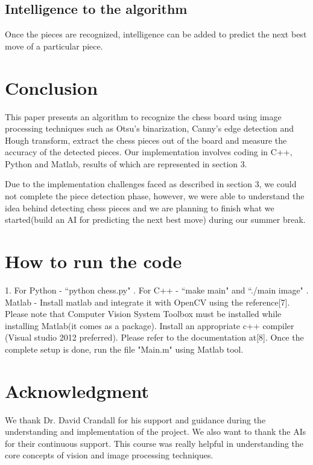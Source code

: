 \documentclass[conference]{IEEEtran}
\begin{document}
\subsection{Intelligence to the algorithm}
Once the pieces are recognized, intelligence can be added to predict the next best move of a particular piece. 

\section{Conclusion}
This paper presents an algorithm to recognize the chess board using image processing techniques such as Otsu's binarization, Canny's edge detection and Hough transform, extract the chess pieces out of the board and measure the accuracy of the detected pieces. Our implementation involves coding in C++, Python and Matlab, results of which are represented in section 3. 	

Due to the implementation challenges faced as described in section 3, we could not complete the piece detection phase, however, we were able to understand the idea behind detecting chess pieces and we are planning to finish what we started(build an AI for predicting the next best move) during our summer break.




\section*{How to run the code}
1. For Python - ``python chess.py" . For C++ - ``make main" and ``./main image" . Matlab - Install matlab and integrate it with OpenCV using the reference[7]. Please note that Computer Vision System Toolbox must be installed while installing Matlab(it comes as a package). Install an appropriate c++ compiler (Visual studio 2012 preferred). Please refer to the documentation at[8]. Once the complete setup is done, run the file "Main.m" using Matlab tool. 

\section*{Acknowledgment}
We thank Dr. David Crandall for his support and guidance during the understanding and implementation of the project. We also want to thank the AIs for their continuous support. This course was really helpful in understanding the core concepts of vision and image processing techniques. 
\end{document}
